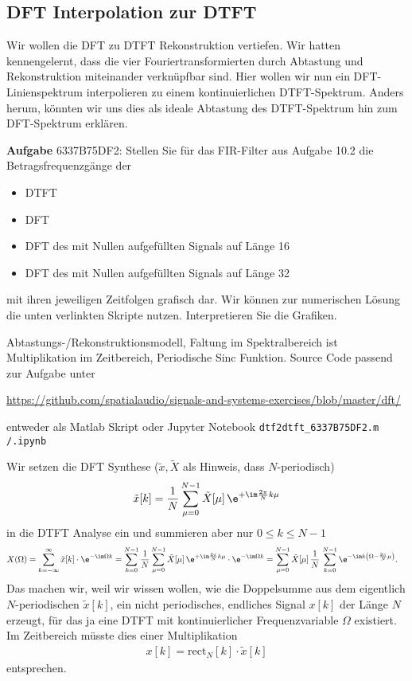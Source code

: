\subsection{DFT Interpolation zur DTFT}
\label{sec:6337B75DF2}
\begin{Ziel}
Wir wollen die DFT zu DTFT Rekonstruktion vertiefen. Wir hatten kennengelernt,
dass die vier Fouriertransformierten durch Abtastung und Rekonstruktion
miteinander verknüpfbar sind. Hier wollen wir nun ein DFT-Linienspektrum
interpolieren zu einem kontinuierlichen DTFT-Spektrum. Anders herum, könnten
wir uns dies als ideale Abtastung des DTFT-Spektrum hin zum DFT-Spektrum erklären.
\end{Ziel}
\textbf{Aufgabe} {\tiny 6337B75DF2}: Stellen Sie für das FIR-Filter
aus Aufgabe 10.2 die Betragsfrequenzgänge der
\begin{itemize}
  \setlength\itemsep{-0.5em}
  \item DTFT
  \item DFT
  \item DFT des mit Nullen aufgefüllten Signals auf Länge 16
  \item DFT des mit Nullen aufgefüllten Signals auf Länge 32
\end{itemize}
mit ihren jeweiligen Zeitfolgen grafisch dar. Wir können zur numerischen Lösung
die unten verlinkten Skripte nutzen.
Interpretieren Sie die Grafiken.
\begin{Werkzeug}
Abtastungs-/Rekonstruktionsmodell, Faltung im Spektralbereich ist Multiplikation
im Zeitbereich, Periodische Sinc Funktion.
%
Source Code passend zur Aufgabe unter

\url{https://github.com/spatialaudio/signals-and-systems-exercises/blob/master/dft/}

entweder als Matlab Skript oder Jupyter Notebook
\texttt{dtf2dtft\_6337B75DF2.m /.ipynb}

\end{Werkzeug}
\begin{Ansatz}
Wir setzen die DFT Synthese ($\tilde{x}, \tilde{X}$ als Hinweis, dass $N$-periodisch)
%
\begin{equation}
\tilde{x}[k]=\frac{1}{N} \sum_{\mu=0}^{N-1}\tilde{X}[\mu]\,\e^{+\im\frac{2\pi}{N}k\mu}
\end{equation}
%
in die DTFT Analyse ein und summieren aber nur $0 \leq k \leq N-1$
\begin{align}
X(\Omega)&=\sum_{k=-\infty}^\infty \tilde{x}[k]\cdot\e^{-\im\Omega k}
=\sum_{k=0}^{N-1}\frac{1}{N}\sum_{\mu=0}^{N-1}\tilde{X}[\mu]\,\e^{+\im\frac{2\pi}{N}k\mu}\cdot\e^{-\im\Omega k}
=\sum_{\mu=0}^{N-1}\tilde{X}[\mu]\,\frac{1}{N}\,\sum_{k=0}^{N-1}\e^{-\im k\left(\Omega-\frac{2\pi}{N}\mu\right)}.
\end{align}
%
Das machen wir, weil wir wissen wollen, wie die Doppelsumme
aus dem eigentlich $N$-periodischen $\tilde{x}[k]$,
ein nicht periodisches, endliches Signal $x[k]$ der Länge $N$ erzeugt,
für das ja eine DTFT mit kontinuierlicher Frequenzvariable $\Omega$ existiert.
%
Im Zeitbereich müsste dies einer Multiplikation
\begin{align}
x[k] = \mathrm{rect}_N[k] \cdot \tilde{x}[k]
\end{align}
entsprechen.

\end{Ansatz}
